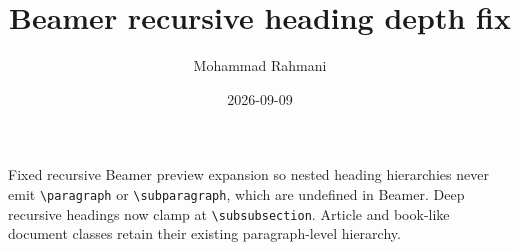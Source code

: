 \documentclass[a4paper]{article}
\title{Beamer recursive heading depth fix}
\date{2026-09-09}
\author{Mohammad Rahmani}
\begin{document}
   \maketitle

   \begin{preview}
      Fixed recursive Beamer preview expansion so nested heading hierarchies never
      emit \texttt{\textbackslash paragraph} or
      \texttt{\textbackslash subparagraph}, which are undefined in Beamer.
      Deep recursive headings now clamp at
      \texttt{\textbackslash subsubsection}. Article and book-like document
      classes retain their existing paragraph-level hierarchy.
   \end{preview}

   
   
\end{document}
